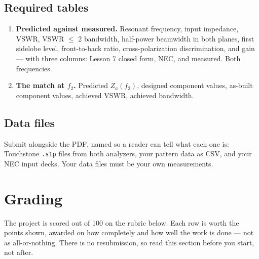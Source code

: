 \documentclass{exam}
\begin{document}
\subsection{Required tables}

\begin{enumerate}[nosep]
	\item \textbf{Predicted against measured.} Resonant frequency, input
	      impedance, VSWR, VSWR $\le$ 2 bandwidth, half-power beamwidth in both
	      planes, first sidelobe level, front-to-back ratio, cross-polarization
	      discrimination, and gain --- with three columns: Lesson 7 closed
	      form, NEC, and measured. Both frequencies.
	\item \textbf{The match at $f_2$.} Predicted $Z_a(f_2)$, designed component
	      values, as-built component values, achieved VSWR, achieved bandwidth.
\end{enumerate}

\subsection{Data files}

Submit alongside the PDF, named so a reader can tell what each one is:
Touchstone \texttt{.s1p} files from both analyzers, your pattern data as CSV,
and your NEC input decks. Your data files must be your own measurements.

\section{Grading}

The project is scored out of 100 on the rubric below. Each row is worth the
points shown, awarded on how completely and how well the work is done --- not
as all-or-nothing. There is no resubmission, so read this section before you
start, not after.
\end{document}
